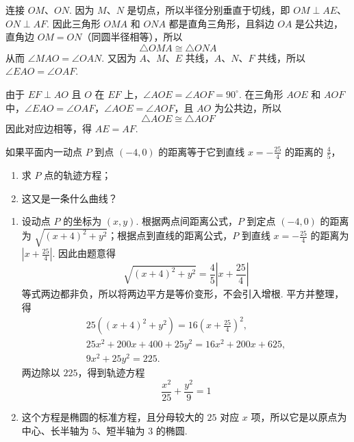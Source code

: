 \begin{solution}
连接 \(OM\)、\(ON\). 因为 \(M\)、\(N\) 是切点，所以半径分别垂直于切线，即 \(OM\perp AE\)、\(ON\perp AF\). 因此三角形 \(OMA\) 和 \(ONA\) 都是直角三角形，且斜边 \(OA\) 是公共边，直角边 \(OM=ON\)（同圆半径相等），所以
\[
\triangle OMA\cong\triangle ONA
\]
从而 \(\angle MAO=\angle OAN\). 又因为 \(A\)、\(M\)、\(E\) 共线，\(A\)、\(N\)、\(F\) 共线，所以 \(\angle EAO=\angle OAF\).

由于 \(EF\perp AO\) 且 \(O\) 在 \(EF\) 上，\(\angle AOE=\angle AOF=90^\circ\). 在三角形 \(AOE\) 和 \(AOF\) 中，\(\angle EAO=\angle OAF\)，\(\angle AOE=\angle AOF\)，且 \(AO\) 为公共边，所以
\[
\triangle AOE\cong\triangle AOF
\]
因此对应边相等，得 \(AE=AF\).
\end{solution}

\begin{problem}
如果平面内一动点 \(P\) 到点 \(\left(-4,0\right)\) 的距离等于它到直线 \(x=-\frac{25}{4}\) 的距离的 \(\frac{4}{5}\)，
\begin{enumerate}
\item 求 \(P\) 点的轨迹方程；
\item 这又是一条什么曲线？
\end{enumerate}
\end{problem}

\begin{solution}
\begin{enumerate}
\item
设动点 \(P\) 的坐标为 \(\left(x,y\right)\). 根据两点间距离公式，\(P\) 到定点 \(\left(-4,0\right)\) 的距离为 \(\sqrt{\left(x+4\right)^2+y^2}\)；根据点到直线的距离公式，\(P\) 到直线 \(x=-\frac{25}{4}\) 的距离为 \(\left|x+\frac{25}{4}\right|\). 因此由题意得
\[
\sqrt{\left(x+4\right)^2+y^2}=\frac{4}{5}\left|x+\frac{25}{4}\right|
\]
等式两边都非负，所以将两边平方是等价变形，不会引入增根. 平方并整理，得
\[
\begin{gathered}
25\left(\left(x+4\right)^2+y^2\right)=16\left(x+\frac{25}{4}\right)^2,\\
25x^2+200x+400+25y^2=16x^2+200x+625,\\
9x^2+25y^2=225.
\end{gathered}
\]
两边除以 \(225\)，得到轨迹方程
\[
\frac{x^2}{25}+\frac{y^2}{9}=1
\]
\item 这个方程是椭圆的标准方程，且分母较大的 \(25\) 对应 \(x\) 项，所以它是以原点为中心、长半轴为 \(5\)、短半轴为 \(3\) 的椭圆.
\end{enumerate}
\end{solution}

